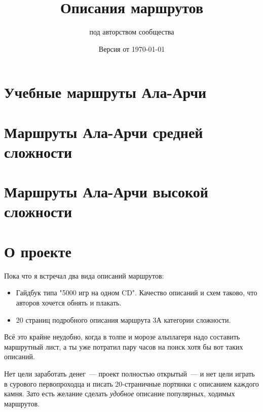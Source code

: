 \documentclass[11pt,fleqn]{report} %
\title{Описания маршрутов}
\date{Версия от \today}
\author{под авторством сообщества}
\begin{document}
\maketitle

\tableofcontents

\chapter{Учебные маршруты Ала-Арчи}

\routeListEasyAlaArcha

\chapter{Маршруты Ала-Арчи средней сложности}

\routeListMiddleAlaArcha

\chapter{Маршруты Ала-Арчи высокой сложности}

\routeListHighAlaArcha



\chapter{О проекте}

\newcommand{\gitRepo}[0]{\href{https://github.com/johnlepikhin/alpine-guidebook}{GitHub}}

Пока что я встречал два вида описаний маршрутов:
\begin{itemize}
\item Гайдбук типа "5000 игр на одном CD". Качество описаний и схем
  таково, что авторов хочется обнять и плакать.
\item 20 страниц подробного описания маршрута 3А категории сложности.
\end{itemize}

Всё это крайне неудобно, когда в толпе и морозе альплагеря надо
составить маршрутный лист, а ты уже потратил пару часов на поиск хотя
бы вот таких описаний.

Нет цели заработать денег~--- проект полностью открытый~--- и нет цели
играть в сурового первопроходца и писать 20-страничные портянки с
описанием каждого камня. Зато есть желание сделать \textit{удобное}
описание популярных, ходимых маршрутов.
\end{document}
